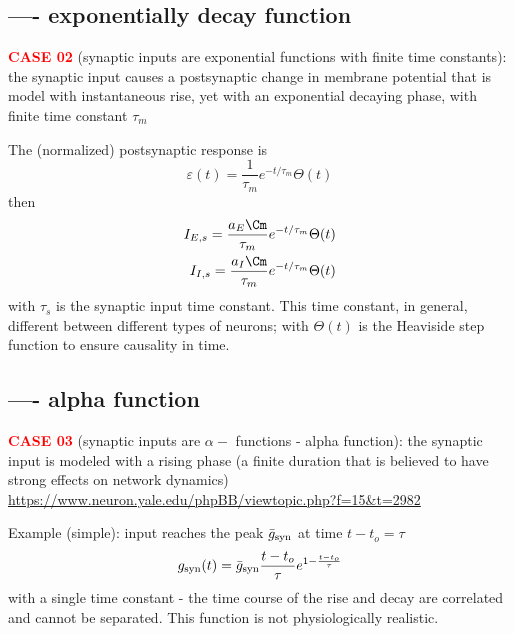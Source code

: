 

\subsection{ ---- exponentially decay function}
\textcolor{red}{\bf CASE 02} (synaptic inputs are exponential functions with
finite time constants): the synaptic input causes a postsynaptic change in
membrane potential that is model with instantaneous rise,
yet with an exponential decaying phase, with finite time constant $\tau_m$

The (normalized) postsynaptic response is
\begin{equation}
\varepsilon(t) = \frac{1}{\tau_m} e^{-t/\tau_m}\Theta(t)
\end{equation}
then
\begin{equation}
\begin{split}
I_{E,s} = \frac{a_E \Cm}{\tau_m} e^{-t/\tau_m} \Theta(t) \\
I_{I,s} = \frac{a_I \Cm}{\tau_m} e^{-t/\tau_m} \Theta(t)
\end{split}
\end{equation}
with $\tau_s$ is the synaptic input time constant. This time constant, in
general, different between different types of neurons; with  $\Theta(t)$ is the
Heaviside step function to ensure causality in time.

\subsection{ ---- alpha function}
\textcolor{red}{\bf CASE 03} (synaptic inputs are $\alpha-$ functions - alpha
function):
the synaptic input is modeled with a rising phase (a finite duration that is
believed to have strong effects on network dynamics)
\url{https://www.neuron.yale.edu/phpBB/viewtopic.php?f=15&t=2982}

Example (simple): input reaches the peak $\bar{g}_{\text{syn}}$ at time $t-t_o=\tau$
\begin{equation}
g_{\text{syn}}(t) = \bar{g}_{\text{syn}} \frac{t-t_o}{\tau} e^{1-\frac{t-t_o}{\tau}}
\end{equation}
with a single time constant - the time course of the rise and decay are
correlated and cannot be separated. This function is not physiologically
realistic.

